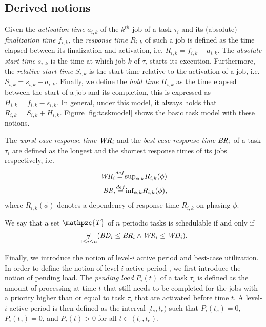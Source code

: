 \documentclass[conference,compsoc]{IEEEtran}
\newcommand\defeq{\stackrel{\mathclap{\tiny\mbox{def}}}{=}}
\newcommand{\bd}    {\mbox{\it BD}}
\newcommand{\br}    {\mbox{\it BR}}
\newcommand{\wcd}   {\mbox{\it WD}}
\renewcommand{\wr}  {\mbox{\it WR}}
\begin{document}
\subsection{Derived notions}
Given the \textit{activation time} $a_{i,k}$ of the $k^{th}$ job of a task $\tau_i$ and its (absolute) \textit{finalization time} $f_{i,k}$, the \textit{response time} $R_{i,k}$ of such a job is defined as the time elapsed between its finalization and activation, i.e. $R_{i,k}=f_{i,k}-a_{i,k}$. The \textit{absolute start time} $s_{i,k}$ is the time at which job $k$ of $\tau_i$ starts its execution. Furthermore, the \textit{relative start time} $S_{i,k}$ is the start time relative to the activation of a job, i.e. $S_{i,k}=s_{i,k}-a_{i,k}$. Finally, we define the \textit{hold time} $H_{i,k}$ as the time elapsed between the start of a job and its completion, this is expressed as $H_{i,k}=f_{i,k}-s_{i,k}$. In general, under this model, it always holds that $R_{i,k}=S_{i,k}+H_{i,k}$. Figure \ref{fig:taskmodel} shows the basic task model with these notions.

The \textit{worst-case response time} $\wr_i$ and the \textit{best-case response time} $\br_i$ of a task $\tau_i$ are defined as the longest and the shortest response times of its jobs respectively, i.e.
\begin{align}
	\wr_i \defeq \text{sup}_{\phi,k} R_{i,k}(\phi)\\
	\br_i \defeq \text{inf}_{\phi,k} R_{i,k}(\phi),
\end{align}
where $R_{i,k}(\phi)$ denotes a dependency of response time $R_{i,k}$ on phasing $\phi$.

We say that a set $\mathpzc{T}$ of $n$ periodic tasks is schedulable if and only if
\begin{align}
	\displaystyle\mathop{\forall}_{1 \leq i \leq n}(\bd_i\leq \br_i \land \wr_i \leq \wcd_i).
\end{align}

Finally, we introduce the notion of level-$i$ active period and best-case utilization. In order to define the notion of level-$i$ active period \cite{BLV09}, we first introduce the notion of pending load. The \textit{pending load} $P_i(t)$ of a task $\tau_i$ is defined as the amount of processing at time $t$ that still needs to be completed for the jobs with a priority higher than or equal to task $\tau_i$ that are activated before time $t$. A level-$i$ active period is then defined as the interval $[t_s,t_e)$ such that $P_i(t_s)=0$, $P_i(t_e)=0$, and $P_i(t)>0$ for all $t \in (t_s,t_e)$.
\end{document}
